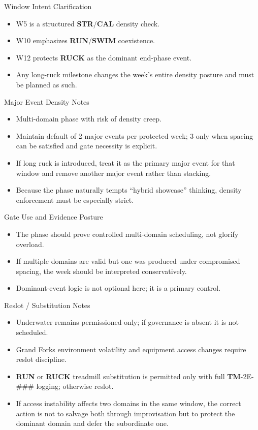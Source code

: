 \documentclass[10pt]{article}
\begin{document}
Window Intent Clarification

\begin{itemize}
\item W5 is a structured \textbf{STR}/\textbf{CAL} density check.
\item W10 emphasizes \textbf{RUN}/\textbf{SWIM} coexistence.
\item W12 protects \textbf{RUCK} as the dominant end-phase event.
\item Any long-ruck milestone changes the week’s entire density posture and must be planned as such.
\end{itemize}

Major Event Density Notes

\begin{itemize}
\item Multi-domain phase with risk of density creep.
\item Maintain default of 2 major events per protected week; 3 only when spacing can be satisfied and gate necessity is explicit.
\item If long ruck is introduced, treat it as the primary major event for that window and remove another major event rather than stacking.
\item Because the phase naturally tempts “hybrid showcase” thinking, density enforcement must be especially strict.
\end{itemize}

Gate Use and Evidence Posture

\begin{itemize}
\item The phase should prove controlled multi-domain scheduling, not glorify overload.
\item If multiple domains are valid but one was produced under compromised spacing, the week should be interpreted conservatively.
\item Dominant-event logic is not optional here; it is a primary control.
\end{itemize}

Reslot / Substitution Notes

\begin{itemize}
\item Underwater remains permissioned-only; if governance is absent it is not scheduled.
\item Grand Forks environment volatility and equipment access changes require reslot discipline.
\item \textbf{RUN} or \textbf{RUCK} treadmill substitution is permitted only with full \textbf{TM}-2E-### logging; otherwise reslot.
\item If access instability affects two domains in the same window, the correct action is not to salvage both through improvisation but to protect the dominant domain and defer the subordinate one.
\end{itemize}
\end{document}
